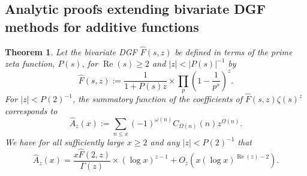 \documentclass[11pt,reqno,a4letter]{article}
\numberwithin{figure}{section}
\numberwithin{table}{section}
\theoremstyle{plain}
\newtheorem{theorem}{Theorem}
\numberwithin{theorem}{section}
\theoremstyle{definition}
\renewcommand{\Re}{\operatorname{Re}}
\begin{document}
\subsection{Analytic proofs extending bivariate DGF methods for additive functions} 

\begin{theorem} 
\label{prop_HatAzx_ModSummatoryFuncExps_RelatedToCkn} 
Let the bivariate DGF $\widehat{F}(s, z)$ be defined in terms of the prime zeta function, $P(s)$,  
for $\Re(s) \geq 2$ and $|z| < |P(s)|^{-1}$ by 
\[
\widehat{F}(s, z) := \frac{1}{1+P(s) z} 
     \times \prod_p \left(1 - \frac{1}{p^s}\right)^{z}. 
\]
For $|z| < P(2)^{-1}$, the 
summatory function of the coefficients of 
$\widehat{F}(s, z) \zeta(s)^{z}$ corresponds to 
\[
\widehat{A}_z(x) := \sum_{n \leq x} (-1)^{\omega(n)} 
     C_{\Omega(n)}(n) z^{\Omega(n)}. 
\]
We have for all sufficiently large $x \geq 2$ and any $|z|< P(2)^{-1}$ that
\[
\widehat{A}_z(x) = \frac{x \widehat{F}(2, z)}{\Gamma(z)} \times (\log x)^{z-1} + 
     O_{z}\left(x (\log x)^{\Re(z) - 2}\right). 
\]
\end{theorem} 
\end{document}
